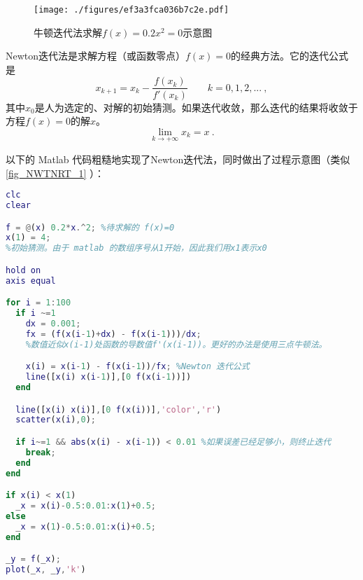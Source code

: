 

\begin{figure}[ht]
\centering
\texttt{[image: ./figures/ef3a3fca036b7c2e.pdf]}
\caption{牛顿迭代法求解$f(x)=0.2x^2=0$示意图} \label{fig_NWTNRT_1}
\end{figure}

Newton迭代法是求解方程（或函数零点）$f(x)=0$的经典方法。它的迭代公式是
\begin{equation}
x_{k+1} = x_k-\frac{f(x_k)}{f'(x_k)} \qquad k=0,1,2,...~,
\end{equation}
其中$x_0$是人为选定的、对解的初始猜测。如果迭代收敛，那么迭代的结果将收敛于方程$f(x)=0$的解$x$。
$$\lim_{k\to+\infty} x_k = x~.$$

以下的 Matlab 代码粗糙地实现了Newton迭代法，同时做出了过程示意图（类似 \autoref{fig_NWTNRT_1} ）：
\begin{lstlisting}[language=matlab]
clc
clear

f = @(x) 0.2*x.^2; %待求解的 f(x)=0
x(1) = 4;  
%初始猜测。由于 matlab 的数组序号从1开始，因此我们用x1表示x0

hold on
axis equal

for i = 1:100
  if i ~=1
    dx = 0.001;
    fx = (f(x(i-1)+dx) - f(x(i-1)))/dx; 
    %数值近似x(i-1)处函数的导数值f'(x(i-1))。更好的办法是使用三点牛顿法。

    x(i) = x(i-1) - f(x(i-1))/fx; %Newton 迭代公式
    line([x(i) x(i-1)],[0 f(x(i-1))])
  end

  line([x(i) x(i)],[0 f(x(i))],'color','r')
  scatter(x(i),0);

  if i~=1 && abs(x(i) - x(i-1)) < 0.01 %如果误差已经足够小，则终止迭代
    break;
  end
end

if x(i) < x(1)
  _x = x(i)-0.5:0.01:x(1)+0.5;
else
  _x = x(1)-0.5:0.01:x(i)+0.5;
end

_y = f(_x);
plot(_x, _y,'k')
\end{lstlisting}
